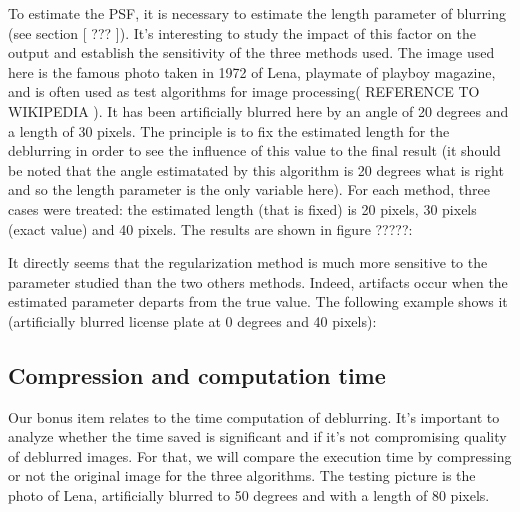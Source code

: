 To estimate the PSF, it is necessary to estimate the length parameter of blurring (see section [ ??? ]). It's interesting to study the impact of this factor on the output and establish the sensitivity of the three methods used.
The image used here is the famous photo taken in 1972 of Lena, playmate of playboy magazine, and is often used as test algorithms for image processing( REFERENCE TO WIKIPEDIA ). It has been artificially blurred here by an angle of 20 degrees and a length of 30 pixels. The principle is to fix the estimated length for the deblurring in order to see the influence of this value to the final result (it should be noted that the angle estimatated by this algorithm is 20 degrees what is right and so the length parameter is the only variable here). For each method, three cases were treated: the estimated length (that is fixed) is 20 pixels, 30 pixels (exact value) and 40 pixels.  The results are shown in figure ?????:


It directly seems that the regularization method is much more sensitive to the parameter studied than the two others methods. Indeed, artifacts occur when the estimated parameter departs from the true value. The following example shows it (artificially blurred license plate at 0 degrees and 40 pixels):



\subsection{Compression and computation time}


Our bonus item relates to the time computation of deblurring. It's important to analyze whether the time saved is significant and if it's not compromising quality of deblurred images. For that, we will compare the execution time by compressing or not the original image for the three algorithms. The testing picture is the photo of Lena, artificially blurred to 50 degrees and with a length of 80 pixels.

